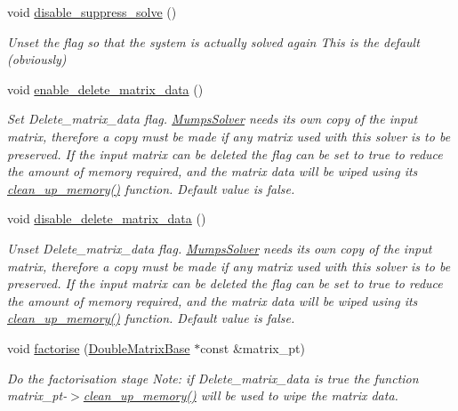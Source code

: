 \begin{DoxyCompactItemize}
void \hyperlink{classoomph_1_1MumpsSolver_a34346022a010acc09dc0ab1ce59d90a7}{disable\+\_\+suppress\+\_\+solve} ()
\begin{DoxyCompactList}\small\item\em Unset the flag so that the system is actually solved again This is the default (obviously) \end{DoxyCompactList}\item 
void \hyperlink{classoomph_1_1MumpsSolver_afbab47dbf3effebd34f3d3ba1634f7d3}{enable\+\_\+delete\+\_\+matrix\+\_\+data} ()
\begin{DoxyCompactList}\small\item\em Set Delete\+\_\+matrix\+\_\+data flag. \hyperlink{classoomph_1_1MumpsSolver}{Mumps\+Solver} needs its own copy of the input matrix, therefore a copy must be made if any matrix used with this solver is to be preserved. If the input matrix can be deleted the flag can be set to true to reduce the amount of memory required, and the matrix data will be wiped using its \hyperlink{classoomph_1_1MumpsSolver_adc1541e4a9cbbe9c641f988380618713}{clean\+\_\+up\+\_\+memory()} function. Default value is false. \end{DoxyCompactList}\item 
void \hyperlink{classoomph_1_1MumpsSolver_a52b3fbf9407cb8284f1c80600b11869f}{disable\+\_\+delete\+\_\+matrix\+\_\+data} ()
\begin{DoxyCompactList}\small\item\em Unset Delete\+\_\+matrix\+\_\+data flag. \hyperlink{classoomph_1_1MumpsSolver}{Mumps\+Solver} needs its own copy of the input matrix, therefore a copy must be made if any matrix used with this solver is to be preserved. If the input matrix can be deleted the flag can be set to true to reduce the amount of memory required, and the matrix data will be wiped using its \hyperlink{classoomph_1_1MumpsSolver_adc1541e4a9cbbe9c641f988380618713}{clean\+\_\+up\+\_\+memory()} function. Default value is false. \end{DoxyCompactList}\item 
void \hyperlink{classoomph_1_1MumpsSolver_aeab520bd25edb0f4e88feaedec689333}{factorise} (\hyperlink{classoomph_1_1DoubleMatrixBase}{Double\+Matrix\+Base} $\ast$const \&matrix\+\_\+pt)
\begin{DoxyCompactList}\small\item\em Do the factorisation stage Note\+: if Delete\+\_\+matrix\+\_\+data is true the function matrix\+\_\+pt-\/$>$\hyperlink{classoomph_1_1MumpsSolver_adc1541e4a9cbbe9c641f988380618713}{clean\+\_\+up\+\_\+memory()} will be used to wipe the matrix data. \end{DoxyCompactList}\item 

\end{DoxyCompactItemize}
